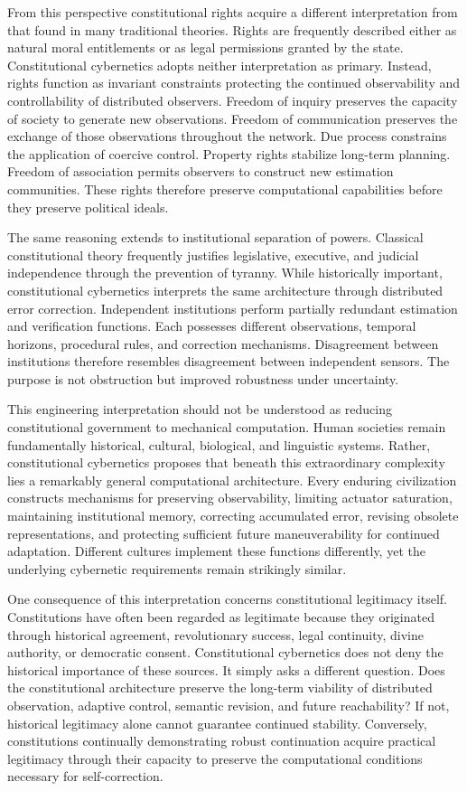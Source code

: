 \documentclass[12pt,a4paper]{article}
\begin{document}
From this perspective constitutional rights acquire a different interpretation from that found in many traditional theories. Rights are frequently described either as natural moral entitlements or as legal permissions granted by the state. Constitutional cybernetics adopts neither interpretation as primary. Instead, rights function as invariant constraints protecting the continued observability and controllability of distributed observers. Freedom of inquiry preserves the capacity of society to generate new observations. Freedom of communication preserves the exchange of those observations throughout the network. Due process constrains the application of coercive control. Property rights stabilize long-term planning. Freedom of association permits observers to construct new estimation communities. These rights therefore preserve computational capabilities before they preserve political ideals.

The same reasoning extends to institutional separation of powers. Classical constitutional theory frequently justifies legislative, executive, and judicial independence through the prevention of tyranny. While historically important, constitutional cybernetics interprets the same architecture through distributed error correction. Independent institutions perform partially redundant estimation and verification functions. Each possesses different observations, temporal horizons, procedural rules, and correction mechanisms. Disagreement between institutions therefore resembles disagreement between independent sensors. The purpose is not obstruction but improved robustness under uncertainty.

This engineering interpretation should not be understood as reducing constitutional government to mechanical computation. Human societies remain fundamentally historical, cultural, biological, and linguistic systems. Rather, constitutional cybernetics proposes that beneath this extraordinary complexity lies a remarkably general computational architecture. Every enduring civilization constructs mechanisms for preserving observability, limiting actuator saturation, maintaining institutional memory, correcting accumulated error, revising obsolete representations, and protecting sufficient future maneuverability for continued adaptation. Different cultures implement these functions differently, yet the underlying cybernetic requirements remain strikingly similar.

One consequence of this interpretation concerns constitutional legitimacy itself. Constitutions have often been regarded as legitimate because they originated through historical agreement, revolutionary success, legal continuity, divine authority, or democratic consent. Constitutional cybernetics does not deny the historical importance of these sources. It simply asks a different question. Does the constitutional architecture preserve the long-term viability of distributed observation, adaptive control, semantic revision, and future reachability? If not, historical legitimacy alone cannot guarantee continued stability. Conversely, constitutions continually demonstrating robust continuation acquire practical legitimacy through their capacity to preserve the computational conditions necessary for self-correction.
\end{document}
